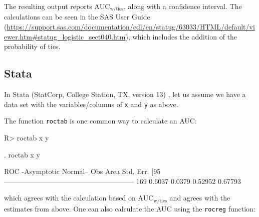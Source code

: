 \documentclass[article]{jss}
\begin{document}
The resulting output reports \(\text{AUC}_{\text{w/ties}}\), along with
a confidence interval. The calculations can be seen in the SAS User
Guide
(\url{https://support.sas.com/documentation/cdl/en/statug/63033/HTML/default/viewer.htm\#statug_logistic_sect040.htm}),
which includes the addition of the probability of ties.

\hypertarget{stata}{%
\subsection{Stata}\label{stata}}

In Stata (StatCorp, College Station, TX, version 13) \citep{stata}, let
us assume we have a data set with the variables/columns of \texttt{x}
and \texttt{y} as above.

The function \texttt{roctab} is one common way to calculate an AUC:

\begin{CodeChunk}

\begin{CodeInput}
R> roctab x y
\end{CodeInput}


\begin{CodeOutput}
 . roctab x y

                      ROC                    -Asymptotic Normal--
           Obs       Area     Std. Err.      [95%
         --------------------------------------------------------
           169     0.6037       0.0379        0.52952     0.67793
\end{CodeOutput}
\end{CodeChunk}

which agrees with the calculation based on
\(\text{AUC}_{\text{w/ties}}\) and agrees with the estimates from above.
One can also calculate the AUC using the \texttt{rocreg} function:
\end{document}
